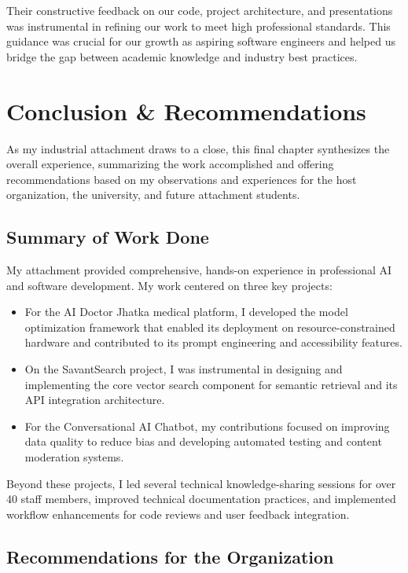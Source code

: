 \documentclass[12pt,a4paper]{article}
\begin{document}
Their constructive feedback on our code, project architecture, and presentations was instrumental in refining our work to meet high professional standards. This guidance was crucial for our growth as aspiring software engineers and helped us bridge the gap between academic knowledge and industry best practices.

\newpage
\section{Conclusion \& Recommendations}

As my industrial attachment draws to a close, this final chapter synthesizes the overall experience, summarizing the work accomplished and offering recommendations based on my observations and experiences for the host organization, the university, and future attachment students.

\subsection{Summary of Work Done}

My attachment provided comprehensive, hands-on experience in professional AI and software development. My work centered on three key projects:
\begin{itemize}
    \item  For the AI Doctor Jhatka medical platform, I developed the model optimization framework that enabled its deployment on resource-constrained hardware and contributed to its prompt engineering and accessibility features.
    \item On the SavantSearch project, I was instrumental in designing and implementing the core vector search component for semantic retrieval and its API integration architecture.
    \item For the Conversational AI Chatbot, my contributions focused on improving data quality to reduce bias and developing automated testing and content moderation systems. 
\end{itemize}

Beyond these projects, I led several technical knowledge-sharing sessions for over 40 staff members, improved technical documentation practices, and implemented workflow enhancements for code reviews and user feedback integration.

\subsection{Recommendations for the Organization}
\end{document}
